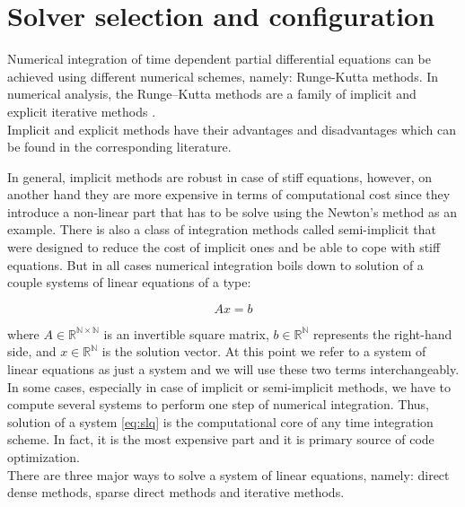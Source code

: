\chapter{Solver selection and configuration}
\label{chapter:solver configuration}
Numerical integration of time dependent partial differential equations can be achieved using different numerical schemes, namely: Runge-Kutta methods. In numerical analysis, the Runge–Kutta methods are a family of implicit and explicit iterative methods \cite{wiki:runge-kutta}.  \\


Implicit and explicit methods have their advantages and disadvantages which can be found in the corresponding literature.

 In general, implicit methods are robust in case of stiff equations, however, on another hand they are more expensive in terms of computational cost since they introduce a non-linear part that has to be solve using the Newton's method as an example. There is also a class of integration methods called semi-implicit that were designed to reduce the cost of implicit ones and be able to cope with stiff equations. But in all cases numerical integration boils down to solution of a couple systems of linear equations of a type:

\begin{equation} \label{eq:slq}
	Ax = b
\end{equation}

 where $A \in \mathbb{R^{N \times N}}$ is an invertible square matrix, $b \in \mathbb{R^{N}}$ represents the right-hand side, and $x \in \mathbb{R^{N}}$ is the solution vector. At this point we refer to a system of linear equations as just a system and we will use these two terms interchangeably. \\
 
In some cases, especially in case of implicit or semi-implicit methods, we have to compute several systems to perform one step of numerical integration. Thus, solution of a system \ref{eq:slq} is the computational core of any time integration scheme. In fact, it is the most expensive part and it is primary source of code optimization. \\ 

There are three major ways to solve a system of linear equations, namely: direct dense methods, sparse direct methods and iterative methods.\\

